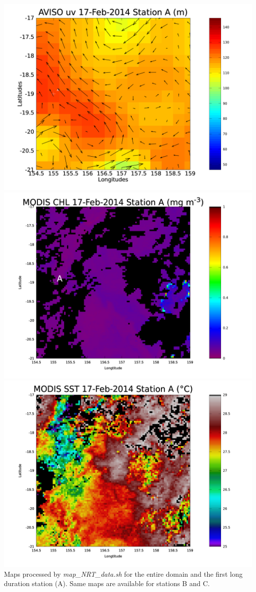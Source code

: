 \documentclass[12pt,a4paper]{article}
\begin{document}
\includegraphics[scale=0.18]{Figures/20140217_AVISO_d0_uv_stationA.png}
\includegraphics[scale=0.18]{Figures/20140217_MODIS_stationA_CHL.png}
\includegraphics[scale=0.18]{Figures/20140217_MODIS_stationA_SST.png}
Maps processed by \textit{map\_NRT\_data.sh} for the entire domain and the first long duration station (A). Same maps are available for stations B and C.
\end{document}

